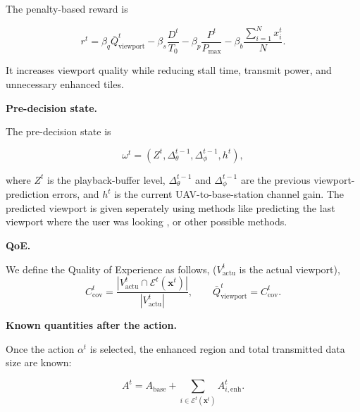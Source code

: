 \documentclass[10pt,conference,a4paper]{IEEEtran}
\newcommand{\head}[1]{%
    \vspace{2pt}
    \noindent
    \textbf{#1}
    \hspace{2pt}
}
\begin{document}
The penalty-based reward is

\begin{equation}
r^t
=
\beta_q\bar Q_{\mathrm{viewport}}^t
-
\beta_s\frac{D^t}{T_0}
-
\beta_p\frac{P^t}{P_{\max}}
-
\beta_b
\frac{
\sum_{i=1}^{N}x_i^t
}{
N
}.
\end{equation}

It increases viewport quality while reducing stall time,
transmit power, and unnecessary enhanced tiles.


\head{Pre-decision state.}
The pre-decision state is

\begin{equation}
\omega^t
=
\left(
Z^t,
\Delta_\theta^{t-1},
\Delta_\phi^{t-1},
h^t
\right),
\end{equation}

where $Z^t$ is the playback-buffer level,
$\Delta_\theta^{t-1}$ and $\Delta_\phi^{t-1}$ are the previous
viewport-prediction errors, and $h^t$ is the current
UAV-to-base-station channel gain. The predicted viewport is given seperately using methods like predicting the last viewport where the user was looking , or other possible methods.


\head{QoE.}
We define the Quality of Experience as follows, ($V_{\mathrm{actu}}^t$ is the actual viewport),
\begin{equation}
C_{\mathrm{cov}}^t
=
\frac{
\left|
V_{\mathrm{actu}}^t
\cap
\mathcal{E}^t(\mathbf{x}^t)
\right|
}{
\left|
V_{\mathrm{actu}}^t
\right|
},
\qquad
\bar Q_{\mathrm{viewport}}^t
=
C_{\mathrm{cov}}^t.
\end{equation}


\head{Known quantities after the action.}
Once the action $\alpha^t$ is selected, the enhanced region and
total transmitted data size are known:

\begin{equation}
A^t
=
A_{\mathrm{base}}
+
\sum_{i\in\mathcal{E}^t(\mathbf{x}^t)}
A_{i,\mathrm{enh}}^t.
\end{equation}
\end{document}
